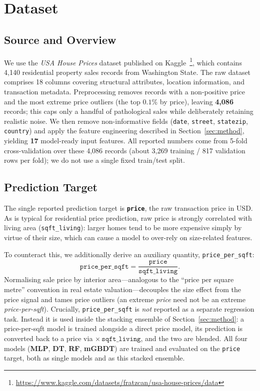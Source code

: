 \section{Dataset}

\subsection{Source and Overview}

We use the \textit{USA House Prices} dataset published on Kaggle~\footnote{\url{https://www.kaggle.com/datasets/fratzcan/usa-house-prices/data}},
which contains 4,140 residential property sales records from Washington State.
The raw dataset comprises 18 columns covering structural attributes, location
information, and transaction metadata.
Preprocessing removes records with a non-positive price and the most extreme
price outliers (the top $0.1\%$ by price), leaving \textbf{4,086} records; this
caps only a handful of pathological sales while deliberately retaining realistic
noise.
We then remove non-informative fields (\texttt{date}, \texttt{street},
\texttt{statezip}, \texttt{country}) and apply the feature engineering described
in Section~\ref{sec:method}, yielding \textbf{17} model-ready input features.
All reported numbers come from 5-fold cross-validation over these 4,086 records
(about 3,269 training / 817 validation rows per fold); we do not use a single
fixed train/test split.

\subsection{Prediction Target}

The single reported prediction target is \textbf{\texttt{price}}, the raw
transaction price in USD. As is typical for residential price prediction, raw
price is strongly correlated with living area (\texttt{sqft\_living}): larger
homes tend to be more expensive simply by virtue of their size, which can cause
a model to over-rely on size-related features.

To counteract this, we additionally derive an auxiliary quantity,
\texttt{price\_per\_sqft}:
\begin{equation}
  \texttt{price\_per\_sqft} = \frac{\texttt{price}}{\texttt{sqft\_living}}.
\end{equation}
Normalising sale price by interior area---analogous to the ``price per square
metre'' convention in real estate valuation---decouples the size effect from the
price signal and tames price outliers (an extreme \emph{price} need not be an
extreme \emph{price-per-sqft}).
Crucially, \texttt{price\_per\_sqft} is \emph{not} reported as a separate
regression task. Instead it is used inside the stacking ensemble of
Section~\ref{sec:method}: a price-per-sqft model is trained alongside a direct
price model, its prediction is converted back to a price via $\times\,
\texttt{sqft\_living}$, and the two are blended. All four models (\textbf{MLP},
\textbf{DT}, \textbf{RF}, \textbf{mGBDT}) are trained and evaluated on the
\texttt{price} target, both as single models and as this stacked ensemble.

